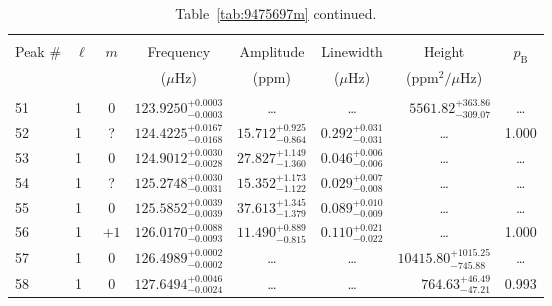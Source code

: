 \begin{table*}[!]
\caption{Table~\ref{tab:9475697m} continued.}
\label{tab:9475697m2}
\centering
\begin{tabular}{llcrrlrc}
\hline\hline
\\[-8pt]          
Peak \# & $\ell$ & $m$ & \multicolumn{1}{c}{Frequency} & \multicolumn{1}{c}{Amplitude} & \multicolumn{1}{c}{Linewidth} & \multicolumn{1}{c}{Height}& $p_\mathrm{B}$\\
 & & & \multicolumn{1}{c}{($\mu$Hz)} & \multicolumn{1}{c}{(ppm)} & \multicolumn{1}{c}{($\mu$Hz)} & \multicolumn{1}{c}{(ppm$^2/\mu$Hz)}\\
\hline \\[-8pt]
51 & 1 & 0 & $    123.9250_{-      0.0003}^{+      0.0003}$ & \multicolumn{1}{c}{\dots} & \multicolumn{1}{c}{\dots} & $     5561.82_{-      309.07}^{+      363.86}$ & \dots \\[1pt]
52 & 1 & ? & $    124.4225_{-      0.0168}^{+      0.0167}$ & $      15.712_{-       0.864}^{+       0.925}$ & $       0.292_{-       0.031}^{+       0.031}$ & \multicolumn{1}{c}{\dots} & 1.000\\[1pt]
53 & 1 & 0 & $    124.9012_{-      0.0028}^{+      0.0030}$ & $      27.827_{-       1.360}^{+       1.149}$ & $       0.046_{-       0.006}^{+       0.006}$ & \multicolumn{1}{c}{\dots} & \dots \\[1pt]
54 & 1 & ? & $    125.2748_{-      0.0031}^{+      0.0030}$ & $      15.352_{-       1.122}^{+       1.173}$ & $       0.029_{-       0.008}^{+       0.007}$ & \multicolumn{1}{c}{\dots} & \dots \\[1pt]
55 & 1 & 0 & $    125.5852_{-      0.0039}^{+      0.0039}$ & $      37.613_{-       1.379}^{+       1.345}$ & $       0.089_{-       0.009}^{+       0.010}$ & \multicolumn{1}{c}{\dots} & \dots \\[1pt]
56 & 1 & $+1$ & $    126.0170_{-      0.0093}^{+      0.0088}$ & $      11.490_{-       0.815}^{+       0.889}$ & $       0.110_{-       0.022}^{+       0.021}$ & \multicolumn{1}{c}{\dots} & 1.000\\[1pt]
57 & 1 & 0 & $    126.4989_{-      0.0002}^{+      0.0002}$ & \multicolumn{1}{c}{\dots} & \multicolumn{1}{c}{\dots} & $    10415.80_{-      745.88}^{+     1015.25}$ & \dots \\[1pt]
58 & 1 & 0 & $    127.6494_{-      0.0024}^{+      0.0046}$ & \multicolumn{1}{c}{\dots} & \multicolumn{1}{c}{\dots} & $      764.63_{-       47.21}^{+       46.49}$ & 0.993\\[1pt]


\end{tabular}
\end{table*}
